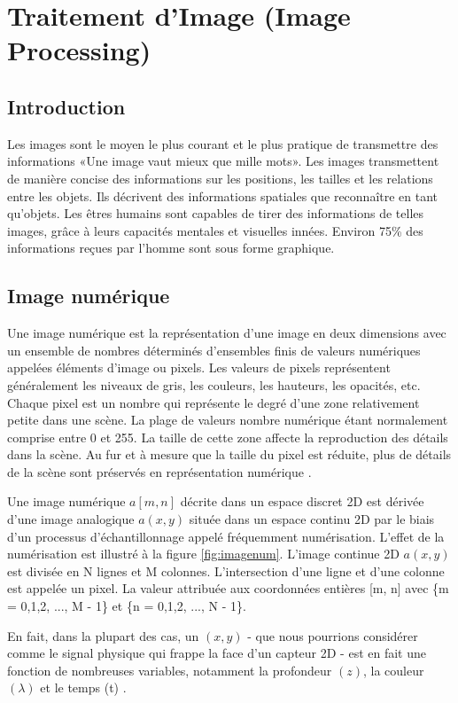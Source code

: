 \documentclass[12pt]{article}
\begin{document}
\newpage
\section{Traitement d’Image (Image Processing)}
\subsection{Introduction}
Les images sont le moyen le plus courant et le plus pratique de transmettre des informations «Une image vaut mieux que mille mots». Les images transmettent de manière concise des informations sur les positions, les tailles et les relations entre les objets. Ils décrivent des informations spatiales que reconnaître en tant qu'objets. Les êtres humains sont capables de tirer des informations de telles images, grâce à leurs capacités mentales et visuelles innées. Environ 75\% des informations reçues par l'homme sont sous forme graphique.

\subsection{Image numérique}
Une image numérique est la représentation d'une image en deux dimensions avec un ensemble de nombres déterminés d'ensembles finis de valeurs numériques appelées éléments d'image ou pixels. Les valeurs de pixels représentent généralement les niveaux de gris, les couleurs, les hauteurs, les opacités, etc. Chaque pixel est un nombre qui représente le degré  d'une zone relativement petite dans une scène. La plage de valeurs nombre numérique étant normalement comprise entre 0 et 255. La taille de cette zone affecte la reproduction des détails dans la scène. Au fur et à mesure que la taille du pixel est réduite, plus de détails de la scène sont préservés en représentation numérique \cite{12}.

Une image numérique $a[m, n]$ décrite dans un espace discret 2D est dérivée d'une image analogique $a(x, y)$ située dans un espace continu 2D par le biais d'un processus d'échantillonnage appelé fréquemment numérisation. L'effet de la numérisation est illustré à la figure \ref{fig:imagenum}. L'image continue 2D $a(x, y)$ est divisée en N lignes et M colonnes. L'intersection d'une ligne et d'une colonne est appelée un pixel. La valeur attribuée aux coordonnées entières [m, n] avec \{m = 0,1,2, ..., M - 1\} et \{n = 0,1,2, ..., N - 1\}.

En fait, dans la plupart des cas, un $(x, y)$ - que nous pourrions considérer comme le signal physique qui frappe la face d’un capteur 2D - est en fait une fonction de nombreuses variables, notamment la profondeur $(z)$, la couleur $(\lambda)$  et le temps (t) \cite{13}.
\end{document}
